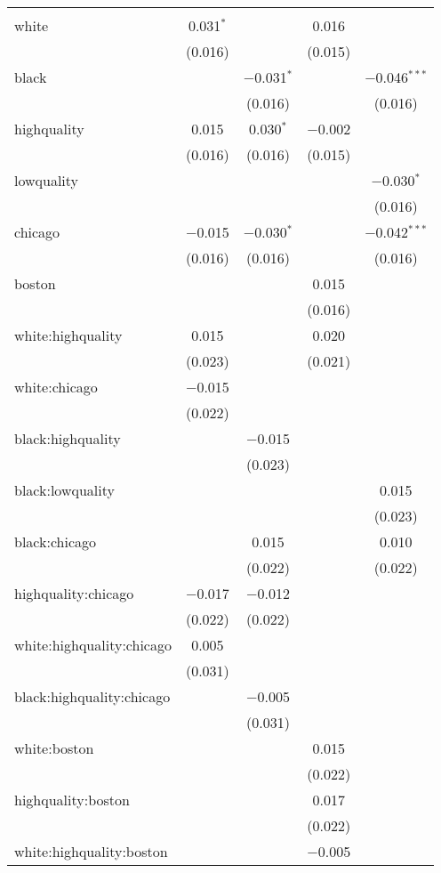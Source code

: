 \documentclass[11pt,notitlepage]{article}\usepackage[]{graphicx}\usepackage[]{color}
\begin{document}
\begin{enumerate}[a)]
\begin{table}[!htbp]
\begin{tabular}{@{\extracolsep{5pt}}lcccc}
\hline \\[-1.8ex] 
 white & 0.031$^{*}$ &  & 0.016 &  \\ 
  & (0.016) &  & (0.015) &  \\ 
  black &  & $-$0.031$^{*}$ &  & $-$0.046$^{***}$ \\ 
  &  & (0.016) &  & (0.016) \\ 
  highquality & 0.015 & 0.030$^{*}$ & $-$0.002 &  \\ 
  & (0.016) & (0.016) & (0.015) &  \\ 
  lowquality &  &  &  & $-$0.030$^{*}$ \\ 
  &  &  &  & (0.016) \\ 
  chicago & $-$0.015 & $-$0.030$^{*}$ &  & $-$0.042$^{***}$ \\ 
  & (0.016) & (0.016) &  & (0.016) \\ 
  boston &  &  & 0.015 &  \\ 
  &  &  & (0.016) &  \\ 
  white:highquality & 0.015 &  & 0.020 &  \\ 
  & (0.023) &  & (0.021) &  \\ 
  white:chicago & $-$0.015 &  &  &  \\ 
  & (0.022) &  &  &  \\ 
  black:highquality &  & $-$0.015 &  &  \\ 
  &  & (0.023) &  &  \\ 
  black:lowquality &  &  &  & 0.015 \\ 
  &  &  &  & (0.023) \\ 
  black:chicago &  & 0.015 &  & 0.010 \\ 
  &  & (0.022) &  & (0.022) \\ 
  highquality:chicago & $-$0.017 & $-$0.012 &  &  \\ 
  & (0.022) & (0.022) &  &  \\ 
  white:highquality:chicago & 0.005 &  &  &  \\ 
  & (0.031) &  &  &  \\ 
  black:highquality:chicago &  & $-$0.005 &  &  \\ 
  &  & (0.031) &  &  \\ 
  white:boston &  &  & 0.015 &  \\ 
  &  &  & (0.022) &  \\ 
  highquality:boston &  &  & 0.017 &  \\ 
  &  &  & (0.022) &  \\ 
  white:highquality:boston &  &  & $-$0.005 &  \\ 

\end{tabular}
\end{table}
\end{enumerate}
\end{document}
